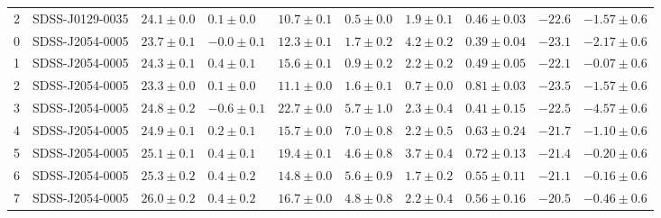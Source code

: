 \begin{tabular}{llllllllll}
2 &   SDSS-J0129-0035 &  $24.1\pm0.0$ &   $0.1\pm0.0$ &  $10.7\pm0.1$ &  $0.5\pm0.0$ &  $1.9\pm0.1$ &  $0.46\pm0.03$ &    $-22.6$ &  $-1.57\pm0.6$ \\
0 &   SDSS-J2054-0005 &  $23.7\pm0.1$ &  $-0.0\pm0.1$ &  $12.3\pm0.1$ &  $1.7\pm0.2$ &  $4.2\pm0.2$ &  $0.39\pm0.04$ &    $-23.1$ &  $-2.17\pm0.6$ \\
1 &   SDSS-J2054-0005 &  $24.3\pm0.1$ &   $0.4\pm0.1$ &  $15.6\pm0.1$ &  $0.9\pm0.2$ &  $2.2\pm0.2$ &  $0.49\pm0.05$ &    $-22.1$ &  $-0.07\pm0.6$ \\
2 &   SDSS-J2054-0005 &  $23.3\pm0.0$ &   $0.1\pm0.0$ &  $11.1\pm0.0$ &  $1.6\pm0.1$ &  $0.7\pm0.0$ &  $0.81\pm0.03$ &    $-23.5$ &  $-1.57\pm0.6$ \\
3 &   SDSS-J2054-0005 &  $24.8\pm0.2$ &  $-0.6\pm0.1$ &  $22.7\pm0.0$ &  $5.7\pm1.0$ &  $2.3\pm0.4$ &  $0.41\pm0.15$ &    $-22.5$ &  $-4.57\pm0.6$ \\
4 &   SDSS-J2054-0005 &  $24.9\pm0.1$ &   $0.2\pm0.1$ &  $15.7\pm0.0$ &  $7.0\pm0.8$ &  $2.2\pm0.5$ &  $0.63\pm0.24$ &    $-21.7$ &  $-1.10\pm0.6$ \\
5 &   SDSS-J2054-0005 &  $25.1\pm0.1$ &   $0.4\pm0.1$ &  $19.4\pm0.1$ &  $4.6\pm0.8$ &  $3.7\pm0.4$ &  $0.72\pm0.13$ &    $-21.4$ &  $-0.20\pm0.6$ \\
6 &   SDSS-J2054-0005 &  $25.3\pm0.2$ &   $0.4\pm0.2$ &  $14.8\pm0.0$ &  $5.6\pm0.9$ &  $1.7\pm0.2$ &  $0.55\pm0.11$ &    $-21.1$ &  $-0.16\pm0.6$ \\
7 &   SDSS-J2054-0005 &  $26.0\pm0.2$ &   $0.4\pm0.2$ &  $16.7\pm0.0$ &  $4.8\pm0.8$ &  $2.2\pm0.4$ &  $0.56\pm0.16$ &    $-20.5$ &  $-0.46\pm0.6$ \\
\bottomrule
\end{tabular}
